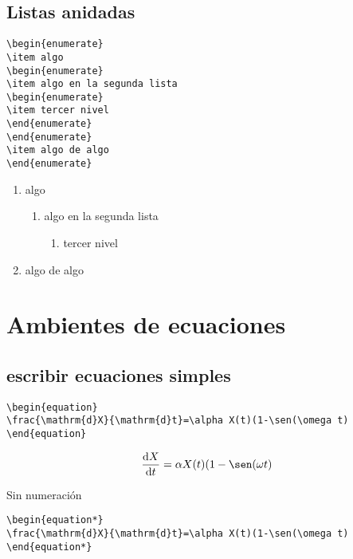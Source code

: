\documentclass{article}
\begin{document}
\subsection{Listas anidadas}

\begin{verbatim}
\begin{enumerate}
\item algo
\begin{enumerate}
\item algo en la segunda lista
\begin{enumerate}
\item tercer nivel
\end{enumerate}
\end{enumerate}
\item algo de algo
\end{enumerate}
\end{verbatim}
\begin{enumerate}
\item algo
\begin{enumerate}
\item algo en la segunda lista
\begin{enumerate}
\item tercer nivel
\end{enumerate}
\end{enumerate}
\item algo de algo
\end{enumerate}


\section{Ambientes de ecuaciones}
\subsection{escribir ecuaciones simples}

\begin{verbatim}
\begin{equation}
\frac{\mathrm{d}X}{\mathrm{d}t}=\alpha X(t)(1-\sen(\omega t)
\end{equation}
\end{verbatim}

\begin{equation}
\frac{\mathrm{d}X}{\mathrm{d}t}=\alpha X(t)(1-\sen(\omega t)
\end{equation}

Sin numeración

\begin{verbatim}
\begin{equation*}
\frac{\mathrm{d}X}{\mathrm{d}t}=\alpha X(t)(1-\sen(\omega t)
\end{equation*}
\end{verbatim}
\end{document}
